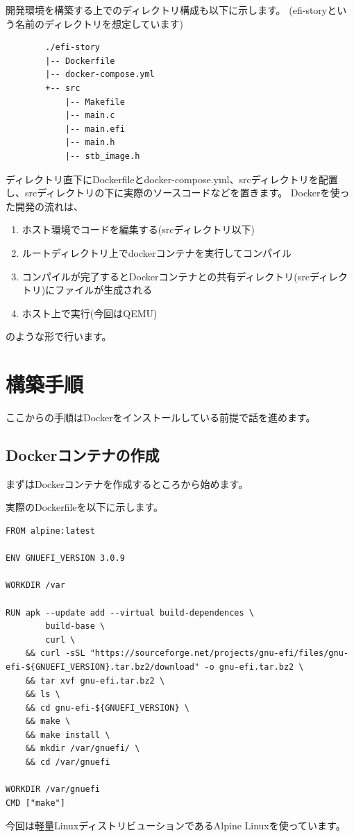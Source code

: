 \documentclass[10pt,b5paper,twoside,openany]{ltjsbook}
\begin{document}
開発環境を構築する上でのディレクトリ構成も以下に示します。
(efi-storyという名前のディレクトリを想定しています)
{
    \centering
    \begin{verbatim}
        ./efi-story
        |-- Dockerfile
        |-- docker-compose.yml
        +-- src
            |-- Makefile
            |-- main.c
            |-- main.efi
            |-- main.h
            |-- stb_image.h
    \end{verbatim}
}
ディレクトリ直下にDockerfileとdocker-compose.yml、srcディレクトリを配置し、srcディレクトリの下に実際のソースコードなどを置きます。
Dockerを使った開発の流れは、
\begin{enumerate}
    \item ホスト環境でコードを編集する(srcディレクトリ以下)
    \item ルートディレクトリ上でdockerコンテナを実行してコンパイル
    \item コンパイルが完了するとDockerコンテナとの共有ディレクトリ(srcディレクトリ)にファイルが生成される
    \item ホスト上で実行(今回はQEMU)
\end{enumerate} 
のような形で行います。

\section{構築手順}
ここからの手順はDockerをインストールしている前提で話を進めます。
\subsection{Dockerコンテナの作成}
まずはDockerコンテナを作成するところから始めます。

実際のDockerfileを以下に示します。
\begin{lstlisting}[caption=dockerfile,label=dockerfile]
FROM alpine:latest

ENV GNUEFI_VERSION 3.0.9

WORKDIR /var

RUN apk --update add --virtual build-dependences \
        build-base \
        curl \
    && curl -sSL "https://sourceforge.net/projects/gnu-efi/files/gnu-efi-${GNUEFI_VERSION}.tar.bz2/download" -o gnu-efi.tar.bz2 \
    && tar xvf gnu-efi.tar.bz2 \
    && ls \
    && cd gnu-efi-${GNUEFI_VERSION} \
    && make \
    && make install \
    && mkdir /var/gnuefi/ \
    && cd /var/gnuefi

WORKDIR /var/gnuefi
CMD ["make"]
\end{lstlisting}
今回は軽量LinuxディストリビューションであるAlpine Linuxを使っています。
\end{document}
